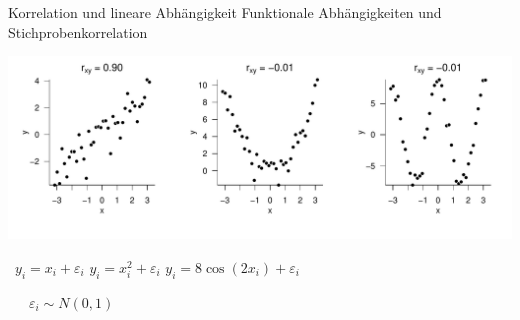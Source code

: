 \documentclass[
  8pt,
  ignorenonframetext,
]{beamer}
\begin{document}
\begin{frame}{Korrelation und lineare Abhängigkeit}
\protect\hypertarget{korrelation-und-lineare-abhuxe4ngigkeit}{}
Funktionale Abhängigkeiten und Stichprobenkorrelation

\vspace{1cm}

\begin{center}\includegraphics[width=1\linewidth]{2_Abbildungen/alm_2_rlinearitaet} \end{center}
\vspace{-5mm}

\(\,\) \hspace{1cm} \(y_i = x_i + \varepsilon_i\) \hspace{1.9cm}
\(y_i = x_i^2 + \varepsilon_i\) \hspace{1.2cm}
\(y_i = 8 \cos(2x_i) + \varepsilon_i\)

\center

\(\quad\,\,\,\varepsilon_i \sim N(0,1)\)
\end{frame}
\end{document}
